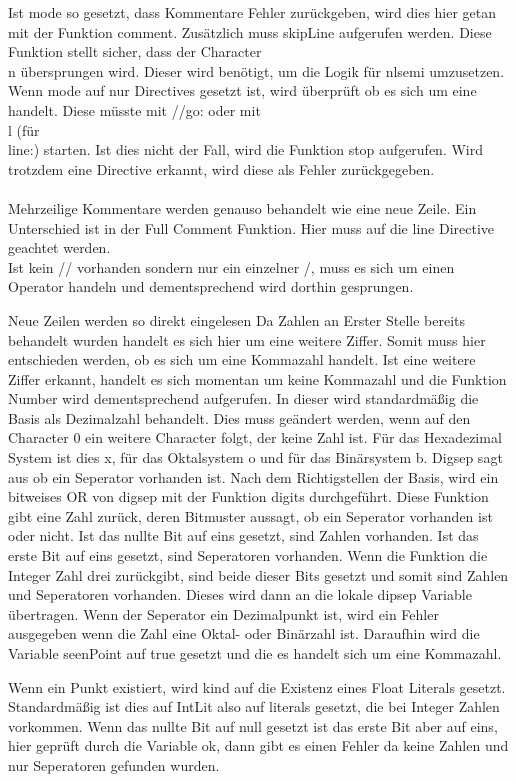 Ist mode so gesetzt, dass Kommentare Fehler zurückgeben, wird dies hier getan mit der Funktion comment. Zusätzlich muss skipLine aufgerufen werden. Diese Funktion stellt sicher, dass der Character \\n übersprungen wird. Dieser wird benötigt, um die Logik für nlsemi umzusetzen. Wenn mode auf nur Directives gesetzt ist, wird überprüft ob es sich um eine handelt. Diese müsste mit //go: oder mit \\l (für \\line:) starten. Ist dies nicht der Fall, wird die Funktion stop aufgerufen. Wird trotzdem eine Directive erkannt, wird diese als Fehler zurückgegeben.\\
\\Mehrzeilige Kommentare werden genauso behandelt wie eine neue Zeile. Ein Unterschied ist in der Full Comment Funktion.
Hier muss auf die line Directive geachtet werden.
\\Ist kein // vorhanden sondern nur ein einzelner /, muss es sich um einen Operator handeln und dementsprechend wird dorthin gesprungen. 

Neue Zeilen werden so direkt eingelesen
Da Zahlen an Erster Stelle bereits behandelt wurden handelt es sich hier um eine weitere Ziffer. Somit muss hier entschieden werden, ob es sich um eine Kommazahl handelt. Ist eine weitere Ziffer erkannt, handelt es sich momentan um keine Kommazahl und die Funktion Number wird dementsprechend aufgerufen. In dieser wird standardmäßig die Basis als Dezimalzahl behandelt. Dies muss geändert werden, wenn auf den Character 0 ein weitere Character folgt, der keine Zahl ist. Für das Hexadezimal System ist dies x, für das Oktalsystem o und für das Binärsystem b. Digsep sagt aus ob ein Seperator vorhanden ist. 
Nach dem Richtigstellen der Basis, wird ein bitweises OR von digsep mit der Funktion digits durchgeführt. Diese Funktion gibt eine Zahl zurück, deren Bitmuster aussagt, ob ein Seperator vorhanden ist oder nicht. Ist das nullte Bit auf eins gesetzt, sind Zahlen vorhanden. Ist das erste Bit auf eins gesetzt, sind Seperatoren vorhanden. Wenn die Funktion die Integer Zahl drei zurückgibt, sind beide dieser Bits gesetzt und somit sind Zahlen und Seperatoren vorhanden. Dieses wird dann an die lokale dipsep Variable übertragen. Wenn der Seperator ein Dezimalpunkt ist, wird ein Fehler ausgegeben wenn die Zahl eine Oktal- oder Binärzahl ist. Daraufhin wird die Variable seenPoint auf true gesetzt und die es handelt sich um eine Kommazahl.

Wenn ein Punkt existiert, wird kind auf die Existenz eines Float Literals gesetzt. Standardmäßig ist dies auf IntLit also auf literals gesetzt, die bei Integer Zahlen vorkommen.
Wenn das nullte Bit auf null gesetzt ist das erste Bit aber auf eins, hier geprüft durch die Variable ok, dann gibt es einen Fehler da keine Zahlen und nur Seperatoren gefunden wurden.

